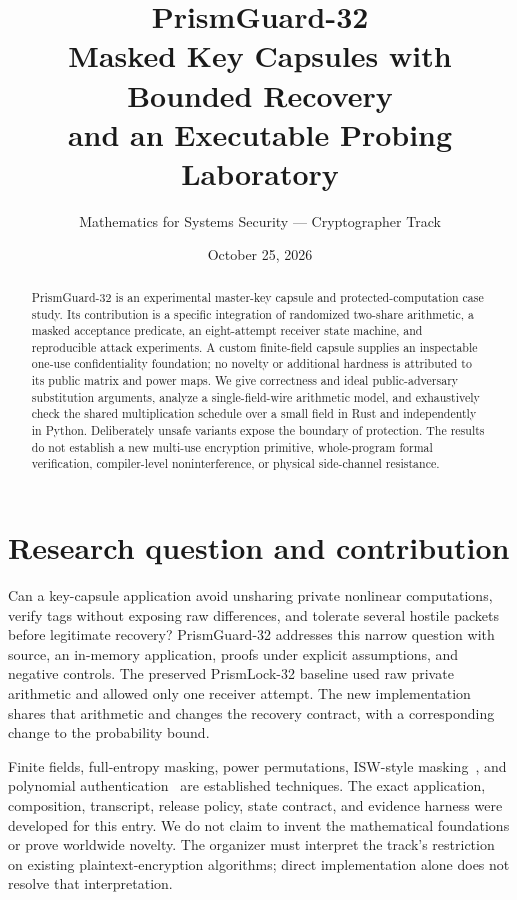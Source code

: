\documentclass[11pt]{article}
\title{\textbf{PrismGuard-32}\\Masked Key Capsules with Bounded Recovery\\and an Executable Probing Laboratory}
\author{Mathematics for Systems Security --- Cryptographer Track}
\date{October 25, 2026}
\begin{document}
\maketitle
\begin{abstract}
PrismGuard-32 is an experimental master-key capsule and protected-computation
case study. Its contribution is a specific integration of randomized
two-share arithmetic, a masked acceptance predicate, an eight-attempt
receiver state machine, and reproducible attack experiments. A custom
finite-field capsule supplies an inspectable one-use confidentiality
foundation; no novelty or additional hardness is attributed to its public
matrix and power maps. We give correctness and ideal public-adversary
substitution arguments, analyze a single-field-wire arithmetic model, and
exhaustively check the shared multiplication schedule over a small field
in Rust and independently in Python. Deliberately unsafe variants expose
the boundary of protection. The results do not establish a new multi-use
encryption primitive, whole-program formal verification, compiler-level
noninterference, or physical side-channel resistance.
\end{abstract}

\section{Research question and contribution}
Can a key-capsule application avoid unsharing private nonlinear computations,
verify tags without exposing raw differences, and tolerate several hostile
packets before legitimate recovery? PrismGuard-32 addresses this narrow
question with source, an in-memory application, proofs under explicit
assumptions, and negative controls. The preserved PrismLock-32 baseline
used raw private arithmetic and allowed only one receiver attempt.
The new implementation shares that arithmetic and changes the recovery
contract, with a corresponding change to the probability bound.

Finite fields, full-entropy masking, power permutations, ISW-style
masking~\cite{isw}, and polynomial authentication~\cite{cw} are established
techniques. The exact application, composition, transcript, release policy,
state contract, and evidence harness were developed for this entry.
We do not claim to invent the mathematical foundations or prove worldwide
novelty. The organizer must interpret the track's restriction on existing
plaintext-encryption algorithms; direct implementation alone does not
resolve that interpretation.
\end{document}
